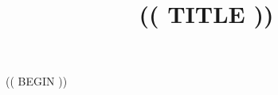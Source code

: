 \documentclass[12pt]{article}
\title{(( TITLE ))}
\date{}
\begin{document}
\maketitle

(( BEGIN ))

	
\end{document}
